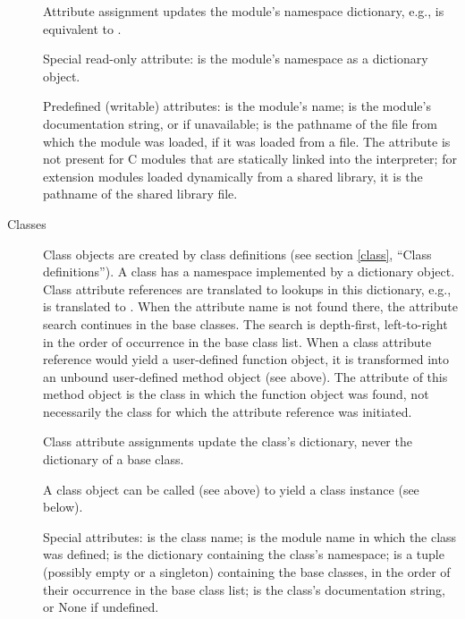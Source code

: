 \begin{description}
Attribute assignment updates the module's namespace dictionary,
e.g.,  is equivalent to .

Special read-only attribute:  is the module's
namespace as a dictionary object.

Predefined (writable) attributes: 
is the module's name;  is the
module's documentation string, or
 if unavailable;  is the pathname of the
file from which the module was loaded, if it was loaded from a file.
The  attribute is not present for C{} modules that are
statically linked into the interpreter; for extension modules loaded
dynamically from a shared library, it is the pathname of the shared
library file.

\item[Classes]
Class objects are created by class definitions (see section
\ref{class}, ``Class definitions'').
A class has a namespace implemented by a dictionary object.
Class attribute references are translated to
lookups in this dictionary,
e.g.,  is translated to .
When the attribute name is not found
there, the attribute search continues in the base classes.  The search
is depth-first, left-to-right in the order of occurrence in the
base class list.
When a class attribute reference would yield a user-defined function
object, it is transformed into an unbound user-defined method object
(see above).  The  attribute of this method object is the
class in which the function object was found, not necessarily the
class for which the attribute reference was initiated.

Class attribute assignments update the class's dictionary, never the
dictionary of a base class.

A class object can be called (see above) to yield a class instance (see
below).

Special attributes:  is the class name;
 is the module name in which the class was defined;
 is the dictionary containing the class's namespace;
 is a tuple (possibly empty or a singleton)
containing the base classes, in the order of their occurrence in the
base class list;  is the class's documentation string,
or None if undefined.


\end{description}
